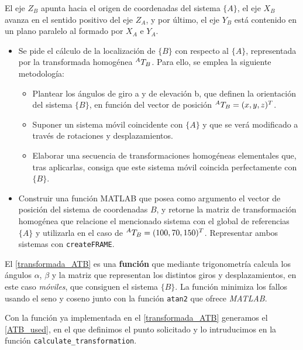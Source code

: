 \documentclass[11pt,a4paper]{article}
\begin{document}
El eje $Z_B$ apunta hacia el origen de coordenadas del sistema $\{A\}$, el eje $X_B$ avanza en el sentido positivo del eje $Z_A$, y por último, el eje $Y_B$ está contenido en un plano paralelo al formado por $X_A$ e $Y_A$.
\begin{itemize}
    \item Se pide el cálculo de la localización de $\{B\}$ con respecto al $\{A\}$, representada por la transformada homogénea ${}^AT_{B}$. Para ello, se emplea la siguiente metodología:
    \begin{itemize}
        \item Plantear los ángulos de giro a y de elevación b, que definen la orientación del sistema $\{B\}$, en función del vector de posición ${}^AT_{{B}} = (x, y, z)^T$. 
        \item Suponer un sistema móvil coincidente con $\{A\}$ y que se verá modificado a través de rotaciones y desplazamientos. 
        \item Elaborar una secuencia de transformaciones homogéneas elementales que, tras aplicarlas, consiga que este sistema móvil coincida perfectamente con $\{B\}$. 
    \end{itemize}

    \item Construir una función MATLAB que posea como argumento el vector de posición del sistema de coordenadas ${B}$, y retorne la matriz de transformación homogénea que relacione el mencionado sistema con el global de referencias $\{A\}$ y utilizarla en el caso de ${}^AT_{{B}} = (100, 70, 150)^T$. Representar ambos sistemas con \texttt{createFRAME}.
\end{itemize} 

    El \autoref{transformada_ATB} es una \textbf{función} que mediante trigonometría calcula los ángulos $\alpha$, $\beta$ y la matriz que representan los distintos giros y desplazamientos, en este caso \textit{móviles}, que consiguen el sistema $\{B\}$. La función minimiza los fallos usando el seno y coseno junto con la función \texttt{atan2} que ofrece \textit{MATLAB}.
    
    \begin{minipage}[c]{\linewidth}
    
    \end{minipage}

    Con la función ya implementada en el \autoref{transformada_ATB} generamos el \autoref{ATB_used}, en el que definimos el punto solicitado y lo intruducimos en la función \texttt{calculate\_transformation}.
\end{document}
